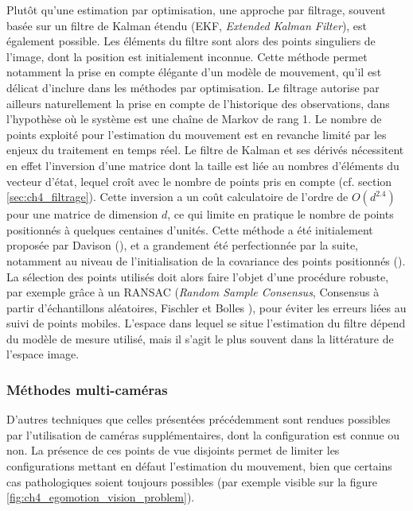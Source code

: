 Plutôt qu'une estimation par optimisation, une approche par filtrage, souvent basée sur un filtre de Kalman étendu (EKF, \emph{Extended Kalman Filter}), est également possible. Les éléments du filtre sont alors des points singuliers de l'image, dont la position est initialement inconnue. Cette méthode permet notamment la prise en compte élégante d'un modèle de mouvement, qu'il est délicat d'inclure dans les méthodes par optimisation. Le filtrage autorise par ailleurs naturellement la prise en compte de l'historique des observations, dans l'hypothèse où le système est une chaîne de Markov de rang 1. Le nombre de points exploité pour l'estimation du mouvement est en revanche limité par les enjeux du traitement en temps réel. Le filtre de Kalman et ses dérivés nécessitent en effet l'inversion d'une matrice dont la taille est liée au nombres d'éléments du vecteur d'état, lequel croît avec le nombre de points pris en compte (cf. section \ref{sec:ch4_filtrage}). Cette inversion a un coût calculatoire de l'ordre de $O(d^{2.4})$ pour une matrice de dimension $d$, ce qui limite en pratique le nombre de points positionnés à quelques centaines d'unités. Cette méthode a été initialement proposée par Davison (\cite{Davison2003}), et a grandement été perfectionnée par la suite, notamment au niveau de l'initialisation de la covariance des points positionnés (\cite{Eade, Montiel, Ortega2007, Feraud2011}). La sélection des points utilisés doit alors faire l'objet d'une procédure robuste, par exemple grâce à un RANSAC (\emph{Random Sample Consensus}, Consensus à partir d'échantillons aléatoires, Fischler et Bolles \cite{Fischler1981}), pour éviter les erreurs liées au suivi de points mobiles. L'espace dans lequel se situe l'estimation du filtre dépend du modèle de mesure utilisé, mais il s'agit le plus souvent dans la littérature de l'espace image.\\

\subsubsection{Méthodes multi-caméras}
D'autres techniques que celles présentées précédemment sont rendues possibles par l'utilisation de caméras supplémentaires, dont la configuration est connue ou non. La présence de ces points de vue disjoints permet de limiter les configurations mettant en défaut l'estimation du mouvement, bien que certains cas pathologiques soient toujours possibles (par exemple visible sur la figure \ref{fig:ch4_egomotion_vision_problem}).

